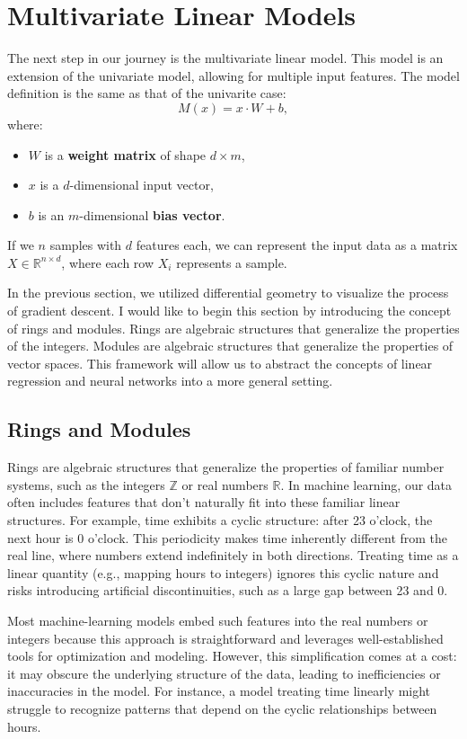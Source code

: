 \section{Multivariate Linear Models}
The next step in our journey is the multivariate linear model. This model is an extension of the univariate model, allowing for multiple input features. The model definition is the same as that of the univarite case:
$$M(x) = x\cdot W + b,$$
where:
\begin{itemize}
    \item $W$ is a \textbf{weight matrix} of shape $d \times m$,
    \item $x$ is a $d$-dimensional input vector,
    \item $b$ is an $m$-dimensional \textbf{bias vector}.
\end{itemize}
If we $n$ samples with $d$ features each, we can represent the input data as a matrix $X\in\mathbb{R}^{n\times d}$, where each row $X_i$ represents a sample. 

In the previous section, we utilized differential geometry to visualize the process of gradient descent. I would like to begin this section by introducing the concept of rings and modules. Rings are algebraic structures that generalize the properties of the integers. Modules are algebraic structures that generalize the properties of vector spaces. This framework will allow us to abstract the concepts of linear regression and neural networks into a more general setting.

\subsection{Rings and Modules}
Rings are algebraic structures that generalize the properties of familiar number systems, such as the integers $\mathbb{Z}$ or real numbers $\mathbb{R}$. In machine learning, our data often includes features that don't naturally fit into these familiar linear structures. For example, time exhibits a cyclic structure: after 23 o'clock, the next hour is 0 o'clock. This periodicity makes time inherently different from the real line, where numbers extend indefinitely in both directions. Treating time as a linear quantity (e.g., mapping hours to integers) ignores this cyclic nature and risks introducing artificial discontinuities, such as a large gap between 23 and 0.

Most machine-learning models embed such features into the real numbers or integers because this approach is straightforward and leverages well-established tools for optimization and modeling. However, this simplification comes at a cost: it may obscure the underlying structure of the data, leading to inefficiencies or inaccuracies in the model. For instance, a model treating time linearly might struggle to recognize patterns that depend on the cyclic relationships between hours.

